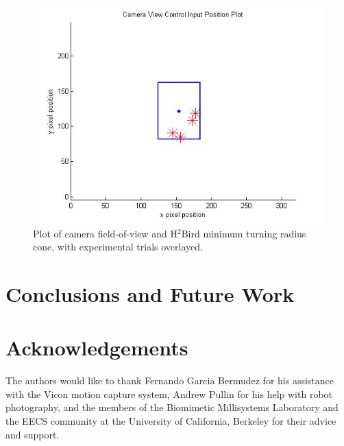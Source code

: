 \documentclass[letterpaper, 10 pt, conference]{ieeeconf}
\begin{document}
\begin{figure}[tb]
\centering
\includegraphics[width=\linewidth]{figures/window_trials.jpg}
\caption{Plot of camera field-of-view and H$^2$Bird minimum turning radius cone, with experimental trials overlayed.}
\label{fig:experiment_cone}
\end{figure}

\addtolength{\textheight}{-0cm}


\section{Conclusions and Future Work}

\section{Acknowledgements}
The authors would like to thank Fernando Garcia Bermudez for his assistance with the Vicon motion capture system, Andrew Pullin for his help with robot photography, and the members of the Biomimetic Millisystems Laboratory and the EECS community at the University of California, Berkeley for their advice and support.


\end{document}
